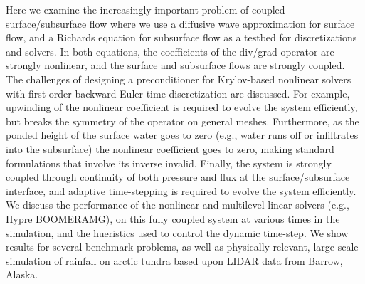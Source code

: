 \documentclass{report}
\begin{document}
Here we examine the increasingly important problem of coupled
surface/subsurface flow where we use a diffusive wave approximation for
surface flow, and a Richards equation for subsurface flow as a testbed
for discretizations and solvers. In both equations, the coefficients of
the div/grad operator are strongly nonlinear, and the surface and
subsurface flows are strongly coupled. The challenges of designing a
preconditioner for Krylov-based nonlinear solvers with first-order
backward Euler time discretization are discussed. For example, upwinding
of the nonlinear coefficient is required to evolve the system
efficiently, but breaks the symmetry of the operator on general meshes.
Furthermore, as the ponded height of the surface water goes to zero
(e.g., water runs off or infiltrates into the subsurface) the nonlinear
coefficient goes to zero, making standard formulations that involve its
inverse invalid. Finally, the system is strongly coupled through
continuity of both pressure and flux at the surface/subsurface interface,
and adaptive time-stepping is required to evolve the system efficiently.
We discuss the performance of the nonlinear and multilevel linear solvers
(e.g., Hypre BOOMERAMG), on this fully coupled system at various times in
the simulation, and the hueristics used to control the dynamic time-step.
We show results for several benchmark problems, as well as physically
relevant, large-scale simulation of rainfall on arctic tundra based upon
LIDAR data from Barrow, Alaska.
\end{document}
